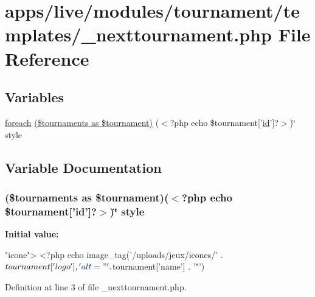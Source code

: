 \hypertarget{live_2modules_2tournament_2templates_2__nexttournament_8php}{\section{apps/live/modules/tournament/templates/\-\_\-nexttournament.php File Reference}
\label{live_2modules_2tournament_2templates_2__nexttournament_8php}
}
\subsection*{Variables}
\begin{DoxyCompactItemize}
\item 
\hyperlink{presse_2modules_2news_2templates_2index_success_8php_abc56db52b2e9a59bcd5c9e45ac5cb332}{foreach} \hyperlink{live_2modules_2tournament_2templates_2__nexttournament_8php_a64107c293eeabff8225523c0f3f6decc}{(\$tournaments as \$tournament)} ($<$?php echo \$tournament\mbox{[}'\hyperlink{live_2modules_2team_2templates_2management_success_8php_ad9851c94d15b310fef9eaded57c23ddf}{id}'\mbox{]}?$>$)\char`\"{} style
\end{DoxyCompactItemize}


\subsection{Variable Documentation}
\hypertarget{live_2modules_2tournament_2templates_2__nexttournament_8php_a64107c293eeabff8225523c0f3f6decc}{
\subsubsection[{(\$tournaments as \$tournament)}]{ (\$tournaments as \$tournament)($<$?php echo \$tournament\mbox{[}'{\bf id}'\mbox{]}?$>$)\char`\"{} style}}\label{live_2modules_2tournament_2templates_2__nexttournament_8php_a64107c293eeabff8225523c0f3f6decc}
{\bfseries Initial value\-:}
\begin{DoxyCode}
\textcolor{stringliteral}{"icone"}>
                    <?php echo  image\_tag(\textcolor{stringliteral}{'/uploads/jeux/icones/'} . $tournament
      [\textcolor{stringliteral}{'logo'}], \textcolor{stringliteral}{'alt="'} . $tournament[\textcolor{stringliteral}{'name'}] . \textcolor{charliteral}{'"'})
\end{DoxyCode}


Definition at line 3 of file \-\_\-nexttournament.\-php.

